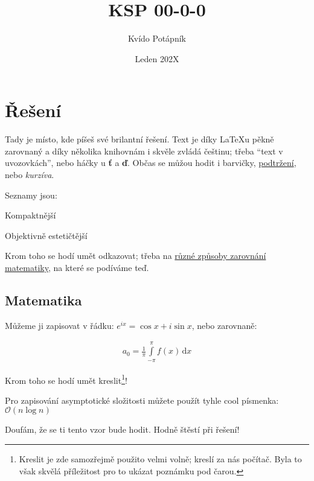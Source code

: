 \documentclass{ksp}
\title{KSP 00-0-0}
\author{Kvído Potápník}
\date{Leden 202X}
\begin{document}
\maketitle

\section*{Řešení}

Tady je místo, kde píšeš své brilantní řešení. Text je díky \LaTeX{u} pěkně zarovnaný a díky několika knihovnám i skvěle zvládá češtinu; třeba \enquote{text v uvozovkách}, nebo háčky u \textbf{ť} a \textbf{ď}. Občas se můžou hodit i {\color{red} barvičky}, \underline{podtržení}, nebo \emph{kurzíva}.

Seznamy jsou:

\begin{compactitem}
    \item Kompaktnější
    \item Objektivně estetičtější
\end{compactitem}

Krom toho se hodí umět odkazovat; třeba na \href{https://en.wikibooks.org/wiki/LaTeX/Advanced_Mathematics#Other_environments}{různé způsoby zarovnání matematiky}, na které se podíváme teď. 

\subsection*{Matematika}

Můžeme ji zapisovat v řádku: $e^{ix} = \cos{x} + i \sin{x}$, nebo zarovnaně:

\begin{gather*}
    a_0=\frac{1}{\pi}\int\limits_{-\pi}^{\pi}f(x)\,\mathrm{d}x
\end{gather*}

Krom toho se hodí umět kreslit\footnote{Kreslit je zde samozřejmě použito velmi volně; kreslí za nás počítač. Byla to však skvělá příležitost pro to ukázat poznámku pod čarou.}!

\hfill


Pro zapisování asymptotické složitosti můžete použít tyhle cool písmenka: $\mathcal{O}(n \log n)$

\begin{center}
    {\large Doufám, že se ti tento vzor bude hodit. Hodně štěstí při řešení!}
\end{center}
\end{document}
